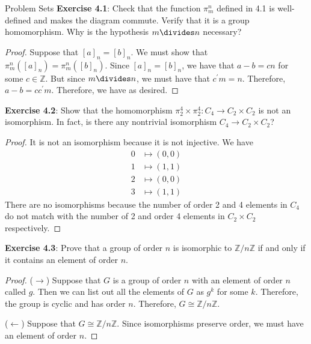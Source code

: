 \documentclass{report}
\begin{document}
\begin{exercises}{Problem Sets}
    \textbf{Exercise 4.1}: Check that the function $\pi_{m}^{n}$ defined in 4.1 is well-defined and makes the diagram commute. Verify that it is a group homomorphism. Why is the hypothesis $m \divides n$ necessary?
        \begin{proof}
            Suppose that $[a]_{n} = [b]_{n}$. We must show that $\pi_{m}^{n}([a]_{n}) = \pi_{m}^{n}([b]_{n})$. Since $[a]_{n} = [b]_{n}$, we have that $a - b = cn$ for some $c \in \mathbb{Z}$. But since $m \divides n$, we must have that $c^{\prime}m = n$. Therefore, $a - b = cc^{\prime}m$. Therefore, we have as desired.
        \end{proof}

    \textbf{Exercise 4.2}: Show that the homomorphism $\pi_{2}^{4} \times \pi_{2}^{4} : C_{4} \rightarrow C_{2} \times C_{2}$ is not an isomorphism. In fact, is there any nontrivial isomorphism $C_{4} \rightarrow C_{2} \times C_{2}$?
        \begin{proof}
            It is not an isomorphism because it is not injective. We have
                \begin{align*}
                    0 &\mapsto  (0, 0) \\
                    1 &\mapsto  (1, 1) \\
                    2 &\mapsto  (0, 0) \\
                    3 &\mapsto  (1, 1)   
                \end{align*}
            There are no isomorphisms because the number of order 2 and 4 elements in $C_{4}$ do not match with the number of 2 and order 4 elements in $C_{2} \times C_{2}$ respectively.
        \end{proof}

    \textbf{Exercise 4.3}: Prove that a group of order $n$ is isomorphic to $\mathbb{Z}/n\mathbb{Z}$ if and only if it contains an element of order $n$.
        \begin{proof}
            ($\rightarrow $) Suppose that $G$ is a group of order $n$ with an element of order $n$ called $g$. Then we can list out all the elements of $G$ as $g^{k}$ for some $k$. Therefore, the group is cyclic and has order $n$. Therefore, $G \cong \mathbb{Z}/n\mathbb{Z}$.

            ($\leftarrow $) Suppose that $G \cong \mathbb{Z}/n\mathbb{Z}$. Since isomorphisms preserve order, we must have an element of order $n$.
        \end{proof}


\end{exercises}
\end{document}
